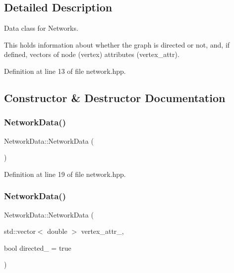 \subsection{Detailed Description}
Data class for Networks. 

This holds information about whether the graph is directed or not, and, if defined, vectors of node (vertex) attributes ({\ttfamily vertex\+\_\+attr}). 

Definition at line 13 of file network.\+hpp.



\subsection{Constructor \& Destructor Documentation}
\mbox{\label{class_network_data_af62a7dde71c52bc49bc1e0ddc27b4724}} 
\subsubsection{\texorpdfstring{Network\+Data()}{NetworkData()}\hspace{0.1cm}{\footnotesize\ttfamily [1/3]}}
{\footnotesize\ttfamily Network\+Data\+::\+Network\+Data (\begin{DoxyParamCaption}{ }\end{DoxyParamCaption})\hspace{0.3cm}{\ttfamily [inline]}}



Definition at line 19 of file network.\+hpp.

\mbox{\label{class_network_data_a431d2c3a6cf9f61437643b767821e4a5}} 
\subsubsection{\texorpdfstring{Network\+Data()}{NetworkData()}\hspace{0.1cm}{\footnotesize\ttfamily [2/3]}}
{\footnotesize\ttfamily Network\+Data\+::\+Network\+Data (\begin{DoxyParamCaption}\item[{std\+::vector$<$ double $>$}]{vertex\+\_\+attr\+\_\+,  }\item[{bool}]{directed\+\_\+ = {\ttfamily true} }\end{DoxyParamCaption})\hspace{0.3cm}{\ttfamily [inline]}}



